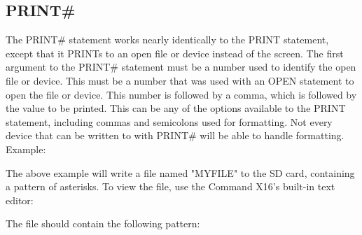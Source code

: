 \subsection{PRINT\#}

The {\ttfamily PRINT\#} statement works nearly identically to the {\ttfamily
PRINT} statement, except that it {\ttfamily PRINT}s to an open file or device
instead of the screen.  The first argument to the {\ttfamily PRINT\#} statement
must be a number used to identify the open file or device.  This must be a
number that was used with an {\ttfamily OPEN} statement to open the file or
device.  This number is followed by a comma, which is followed by the value to
be printed.  This can be any of the options available to the {\ttfamily PRINT}
statement, including commas and semicolons used for formatting.  Not every
device that can be written to with {\ttfamily PRINT\#} will be able to handle
formatting.\\

Example:\\


The above example will write a file named "MYFILE" to the SD card, containing a
pattern of asterisks.  To view the file, use the Command X16's built-in text
editor:\\


The file should contain the following pattern:\\

\codeblock{
	*\\
	**\\
	***\\
	****\\
	*****\\
	******\\
	*******\\
	********\\
	*********\\
	**********\\
}

